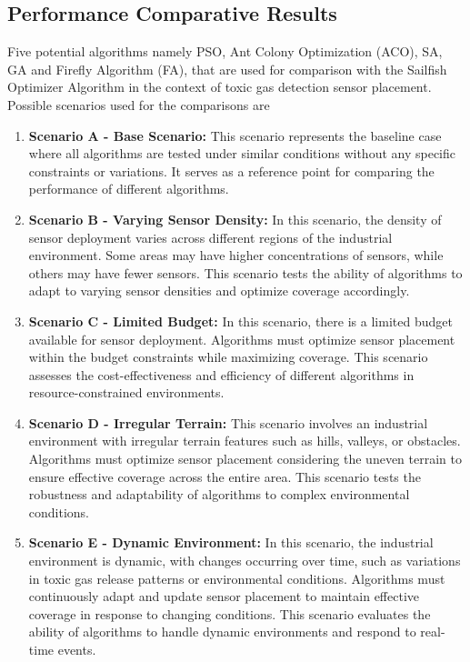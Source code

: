 \documentclass[conference]{IEEEtran}
\begin{document}
\subsection{Performance Comparative Results}
Five potential algorithms namely PSO, Ant Colony Optimization (ACO)\cite{kurian2024optimizing}, SA, GA and Firefly Algorithm (FA)\cite{annapurna2023multi, demri2023energy}, that are used for comparison with the Sailfish Optimizer Algorithm in the context of toxic gas detection sensor placement. Possible scenarios used for the comparisons are 
\begin{enumerate}
    \item \textbf{Scenario A - Base Scenario:} 
    This scenario represents the baseline case where all algorithms are tested under similar conditions without any specific constraints or variations. It serves as a reference point for comparing the performance of different algorithms.
    
    \item \textbf{Scenario B - Varying Sensor Density:} 
    In this scenario, the density of sensor deployment varies across different regions of the industrial environment. Some areas may have higher concentrations of sensors, while others may have fewer sensors. This scenario tests the ability of algorithms to adapt to varying sensor densities and optimize coverage accordingly.
    
    \item \textbf{Scenario C - Limited Budget:} 
    In this scenario, there is a limited budget available for sensor deployment. Algorithms must optimize sensor placement within the budget constraints while maximizing coverage. This scenario assesses the cost-effectiveness and efficiency of different algorithms in resource-constrained environments.
    
    \item \textbf{Scenario D - Irregular Terrain:} 
    This scenario involves an industrial environment with irregular terrain features such as hills, valleys, or obstacles. Algorithms must optimize sensor placement considering the uneven terrain to ensure effective coverage across the entire area. This scenario tests the robustness and adaptability of algorithms to complex environmental conditions.
    
    \item \textbf{Scenario E - Dynamic Environment:} 
    In this scenario, the industrial environment is dynamic, with changes occurring over time, such as variations in toxic gas release patterns or environmental conditions. Algorithms must continuously adapt and update sensor placement to maintain effective coverage in response to changing conditions. This scenario evaluates the ability of algorithms to handle dynamic environments and respond to real-time events.
\end{enumerate}
\end{document}
